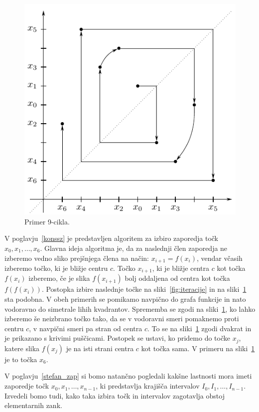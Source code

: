 \documentclass[mat2]{fmfdelo}
\begin{document}
\begin{primer}[9-cikel]
\begin{figure}[h]
  \centering
  \includegraphics{images/spiral.pdf}
  \caption[Primer vektorske slike.]{Primer 9-cikla.}
  \label{fig:spiral}
\end{figure}

V poglavju~\ref{konssz} je predstavljen algoritem za izbiro zaporedja točk $x_0, x_1, \dots, x_6$. Glavna ideja algoritma je, da za naslednji člen zaporedja ne izberemo vedno sliko prejšnjega člena na način: $x_{i+1} = f(x_i)$, vendar včasih izberemo točko, ki je bližje centru $c$. Točko $x_{i+1}$, ki je bližje centra $c$ kot točka $f(x_i)$ izberemo, če je slika $f(x_{i+1})$ bolj oddaljena od centra kot točka $f(f(x_i))$. Postopka izbire naslednje točke na sliki~\ref{fig:iteracije} in na sliki~\ref{fig:spiral} sta podobna. V obeh primerih se pomikamo navpično do grafa funkcije in nato vodoravno do simetrale lihih kvadrantov. Sprememba se zgodi na sliki~\ref{fig:spiral}, ko lahko izberemo še neizbrano točko tako, da se v vodoravni smeri pomaknemo proti centru $c$, v navpični smeri pa stran od centra $c$. To se na sliki~\ref{fig:spiral} zgodi dvakrat in je prikazano s krivimi puščicami. 
Postopek se ustavi, ko pridemo do točke $x_j$, katere slika $f(x_j)$ je na isti strani centra $c$ kot točka sama. V primeru na sliki~\ref{fig:spiral} je to točka $x_6$.

V poglavju~\ref{stefan_zap} si bomo natančno pogledali kakšne lastnosti mora imeti zaporedje točk $x_0, x_1, \dots, x_{n-1}$, ki predstavlja krajišča intervalov $I_0, I_1, \dots, I_{n-1}$. Izvedeli bomo tudi, kako taka izbira točk in intervalov zagotavlja obstoj elementarnih zank.

\end{primer}
\end{document}
